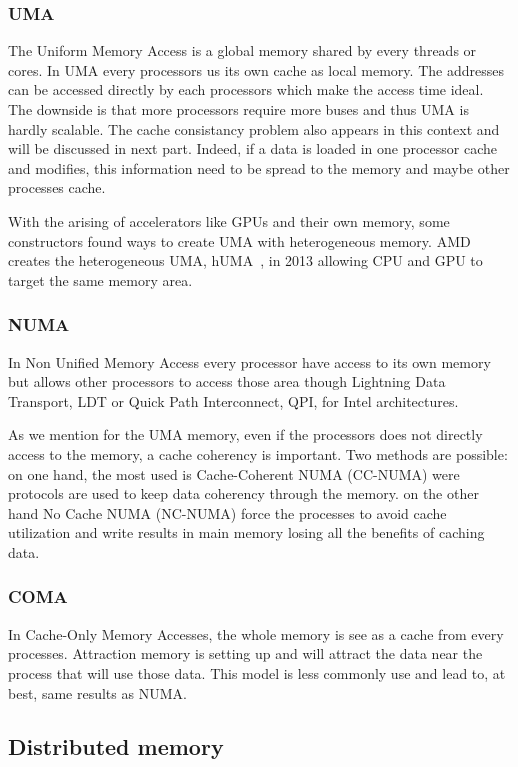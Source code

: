 \subsubsection{UMA}
The Uniform Memory Access is a global memory shared by every threads or cores. 
In UMA every processors us its own cache as local memory. 
The addresses can be accessed directly by each processors which make the access time ideal. 
The downside is that more processors require more buses and thus UMA is hardly scalable. 
The cache consistancy problem also appears in this context and will be discussed in next part. 
Indeed, if a data is loaded in one processor cache and modifies, this information need to be spread to the memory and maybe other processes cache. 

With the arising of accelerators like GPUs and their own memory, some constructors found ways to create UMA with heterogeneous memory. 
AMD creates the heterogeneous UMA, hUMA~\cite{rogers2013amd}, in 2013 allowing CPU and GPU to target the same memory area.

\subsubsection{NUMA}

In Non Unified Memory Access every processor have access to its own memory but allows other processors to access those area though Lightning Data Transport, LDT or Quick Path Interconnect, QPI, for Intel architectures. 

As we mention for the UMA memory, even if the processors does not directly access to the memory, a cache coherency is important. 
Two methods are possible: on one hand, the most used is Cache-Coherent NUMA (CC-NUMA) were protocols are used to keep data coherency through the memory. on the other hand No Cache NUMA (NC-NUMA) force the processes to avoid cache utilization and write results in main memory losing all the benefits of caching data. 

\subsubsection{COMA}
In Cache-Only Memory Accesses, the whole memory is see as a cache from every processes.
Attraction memory is setting up and will attract the data near the process that will use those data. 
This model is less commonly use and lead to, at best, same results as NUMA.

\subsection{Distributed memory}

